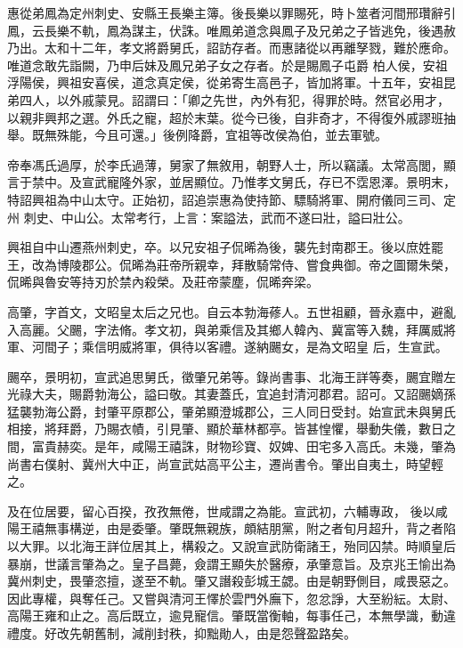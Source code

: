 \begin{pinyinscope}
 惠從弟鳳為定州刺史、安縣王長樂主簿。後長樂以罪賜死，時卜筮者河間邢瓚辭引鳳，云長樂不軌，鳳為謀主，伏誅。唯鳳弟道念與鳳子及兄弟之子皆逃免，後遇赦乃出。太和十二年，孝文將爵舅氏，詔訪存者。而惠諸從以再離孥戮，難於應命。唯道念敢先詣闕，乃申后妹及鳳兄弟子女之存者。於是賜鳳子屯爵
 柏人侯，安祖浮陽侯，興祖安喜侯，道念真定侯，從弟寄生高邑子，皆加將軍。十五年，安祖昆弟四人，以外戚蒙見。詔謂曰：「卿之先世，內外有犯，得罪於時。然官必用才，以親非興邦之選。外氏之寵，超於末葉。從今已後，自非奇才，不得復外戚謬班抽舉。既無殊能，今且可還。」後例降爵，宜祖等改侯為伯，並去軍號。



 帝奉馮氏過厚，於李氏過薄，舅家了無敘用，朝野人士，所以竊議。太常高閭，顯言于禁中。及宣武寵隆外家，並居顯位。乃惟孝文舅氏，存已不霑恩澤。景明末，特詔興祖為中山太守。正始初，詔追崇惠為使持節、驃騎將軍、開府儀同三司、定州
 刺史、中山公。太常考行，上言：案謚法，武而不遂曰壯，謚曰壯公。



 興祖自中山遷燕州刺史，卒。以兄安祖子侃晞為後，襲先封南郡王。後以庶姓罷王，改為博陵郡公。侃晞為莊帝所親幸，拜散騎常侍、嘗食典御。帝之圖爾朱榮，侃晞與魯安等持刃於禁內殺榮。及莊帝蒙塵，侃晞奔梁。



 高肇，字首文，文昭皇太后之兄也。自云本勃海蓚人。五世祖顧，晉永嘉中，避亂入高麗。父颺，字法脩。孝文初，與弟乘信及其鄉人韓內、冀富等入魏，拜厲威將軍、河間子；乘信明威將軍，俱待以客禮。遂納颺女，是為文昭皇
 后，生宣武。



 颺卒，景明初，宣武追思舅氏，徵肇兄弟等。錄尚書事、北海王詳等奏，颺宜贈左光祿大夫，賜爵勃海公，謚曰敬。其妻蓋氏，宜追封清河郡君。詔可。又詔颺嫡孫猛襲勃海公爵，封肇平原郡公，肇弟顯澄城郡公，三人同日受封。始宣武未與舅氏相接，將拜爵，乃賜衣幘，引見肇、顯於華林都亭。皆甚惶懼，舉動失儀，數日之間，富貴赫奕。是年，咸陽王禧誅，財物珍寶、奴婢、田宅多入高氏。未幾，肇為尚書右僕射、冀州大中正，尚宣武姑高平公主，遷尚書令。肇出自夷土，時望輕之。



 及在位居要，留心百揆，孜孜無倦，世咸謂之為能。宣武初，六輔專政，
 後以咸陽王禧無事構逆，由是委肇。肇既無親族，頗結朋黨，附之者旬月超升，背之者陷以大罪。以北海王詳位居其上，構殺之。又說宣武防衛諸王，殆同囚禁。時順皇后暴崩，世議言肇為之。皇子昌薨，僉謂王顯失於醫療，承肇意旨。及京兆王愉出為冀州刺史，畏肇恣擅，遂至不軌。肇又譖殺彭城王勰。由是朝野側目，咸畏惡之。因此專權，與奪任己。又嘗與清河王懌於雲門外廡下，忽忿諍，大至紛紜。太尉、高陽王雍和止之。高后既立，逾見寵信。肇既當衡軸，每事任己，本無學識，動違禮度。好改先朝舊制，減削封秩，抑黜勛人，由是怨聲盈路矣。




\end{pinyinscope}
